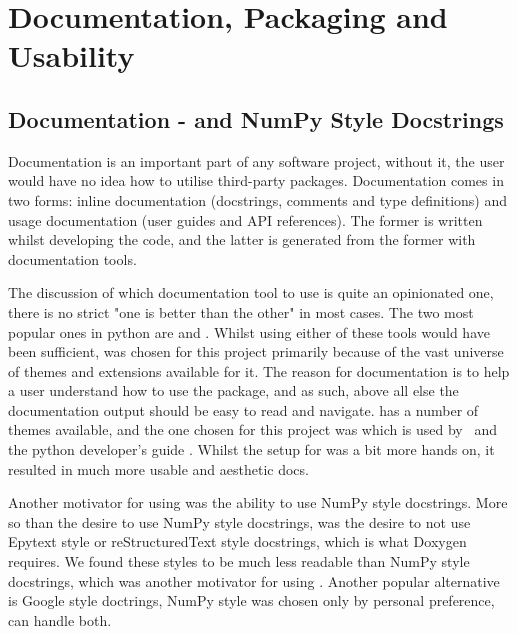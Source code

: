 
\section{Documentation, Packaging and Usability}\label{sec:documentation-packaging-and-usability}
    \subsection{Documentation -  and NumPy Style Docstrings}\label{subsec:documentation-sphinx}
    Documentation is an important part of any software project, without it, the user would have no idea how to utilise
    third-party packages.
    Documentation comes in two forms: inline documentation (docstrings, comments and type definitions) and usage
    documentation (user guides and API references).
    The former is written whilst developing the code, and the latter is generated from the former with documentation tools.

    The discussion of which documentation tool to use is quite an opinionated one, there is no strict "one is better than
    the other" in most cases.
    The two most popular ones in python are  and .
    Whilst using either of these tools would have been sufficient,  was chosen for this project
    primarily because of the vast universe of themes and extensions available for it.
    The reason for documentation is to help a user understand how to use the package, and as such, above all else
    the documentation output should be easy to read and navigate.
     has a number of themes available, and the one chosen for this project was  which
    is used by  \cite{pip-docs}\,  \cite{black-docs} and the python developer's guide
    \cite{python-devguide}.
    Whilst the setup for  was a bit more hands on, it resulted in much more usable and aesthetic docs.

    Another motivator for using  was the ability to use NumPy style docstrings.
    More so than the desire to use NumPy style docstrings, was the desire to not use Epytext style or reStructuredText style
    docstrings, which is what Doxygen requires.
    We found these styles to be much less readable than NumPy style docstrings, which was another motivator for using
    .
    Another popular alternative is Google style doctrings, NumPy style was chosen only by personal preference, 
    can handle both.

